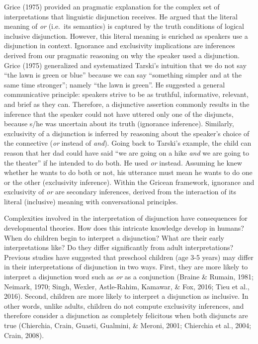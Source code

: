 \documentclass[,man,floatsintext]{apa6}
\begin{document}
Grice (1975) provided an pragmatic explanation for the complex set of interpretations that linguistic disjunction receives. He argued that the literal meaning of \emph{or} (i.e.~its semantics) is captured by the truth conditions of logical inclusive disjunction. However, this literal meaning is enriched as speakers use a disjunction in context. Ignorance and exclusivity implications are inferences derived from our pragmatic reasoning on why the speaker used a disjunction. Grice (1975) generalized and systematized Tarski's intuition that we do not say \enquote{the lawn is green or blue} because we can say \enquote{something simpler and at the same time stronger}; namely \enquote{the lawn is green}. He suggested a general communicative principle: speakers strive to be as truthful, informative, relevant, and brief as they can. Therefore, a disjunctive assertion commonly results in the inference that the speaker could not have uttered only one of the disjuncts, because s/he was uncertain about its truth (ignorance inference). Similarly, exclusivity of a disjunction is inferred by reasoning about the speaker's choice of the connective (\emph{or} instead of \emph{and}). Going back to Tarski's example, the child can reason that her dad could have said \enquote{we are going on a hike \emph{and} we are going to the theater} if he intended to do both. He used \emph{or} instead. Assuming he knew whether he wants to do both or not, his utterance must mean he wants to do one or the other (exclusivity inference). Within the Gricean framework, ignorance and exclusivity of \emph{or} are secondary inferences, derived from the interaction of its literal (inclusive) meaning with conversational principles.

Complexities involved in the interpretation of disjunction have consequences for developmental theories. How does this intricate knowledge develop in humans? When do children begin to interpret a disjunction? What are their early interpretations like? Do they differ significantly from adult interpretations? Previous studies have suggested that preschool children (age 3-5 years) may differ in their interpretations of disjunction in two ways. First, they are more likely to interpret a disjunction word such as \emph{or} as a conjunction (Braine \& Rumain, 1981; Neimark, 1970; Singh, Wexler, Astle-Rahim, Kamawar, \& Fox, 2016; Tieu et al., 2016). Second, children are more likely to interpret a disjunction as inclusive. In other words, unlike adults, children do not compute exclusivity inferences, and therefore consider a disjunction as completely felicitous when both disjuncts are true (Chierchia, Crain, Guasti, Gualmini, \& Meroni, 2001; Chierchia et al., 2004; Crain, 2008).
\end{document}
